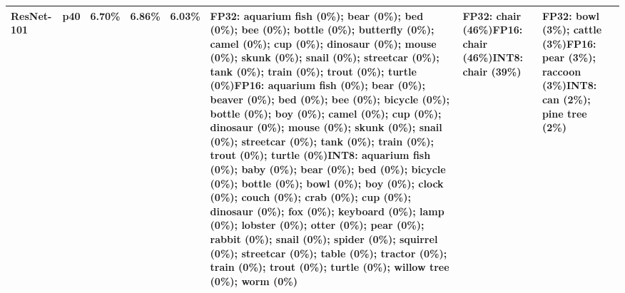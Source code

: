 \begin{longtable}{p{2.8cm} r r r r p{5.0cm} p{4.2cm} p{4.2cm}}
ResNet-101 & p40 & 6.70\% & 6.86\% & 6.03\% & FP32: aquarium fish (0\%); bear (0\%); bed (0\%); bee (0\%); bottle (0\%); butterfly (0\%); camel (0\%); cup (0\%); dinosaur (0\%); mouse (0\%); skunk (0\%); snail (0\%); streetcar (0\%); tank (0\%); train (0\%); trout (0\%); turtle (0\%)\newline FP16: aquarium fish (0\%); bear (0\%); beaver (0\%); bed (0\%); bee (0\%); bicycle (0\%); bottle (0\%); boy (0\%); camel (0\%); cup (0\%); dinosaur (0\%); mouse (0\%); skunk (0\%); snail (0\%); streetcar (0\%); tank (0\%); train (0\%); trout (0\%); turtle (0\%)\newline INT8: aquarium fish (0\%); baby (0\%); bear (0\%); bed (0\%); bicycle (0\%); bottle (0\%); bowl (0\%); boy (0\%); clock (0\%); couch (0\%); crab (0\%); cup (0\%); dinosaur (0\%); fox (0\%); keyboard (0\%); lamp (0\%); lobster (0\%); otter (0\%); pear (0\%); rabbit (0\%); snail (0\%); spider (0\%); squirrel (0\%); streetcar (0\%); table (0\%); tractor (0\%); train (0\%); trout (0\%); turtle (0\%); willow tree (0\%); worm (0\%) & FP32: chair (46\%)\newline FP16: chair (46\%)\newline INT8: chair (39\%) & FP32: bowl (3\%); cattle (3\%)\newline FP16: pear (3\%); raccoon (3\%)\newline INT8: can (2\%); pine tree (2\%) \\ \hline

\end{longtable}
